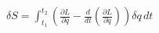 \documentclass[preview]{standalone}
\begin{document}
\begin{center}
$\delta S = \int_{t_1}^{t_2} \left( \frac{\partial L}{\partial q} - \frac{d}{dt} \left( \frac{\partial L}{\partial \dot{q}} \right) \right) \delta q \, dt$
\end{center}
\end{document}
